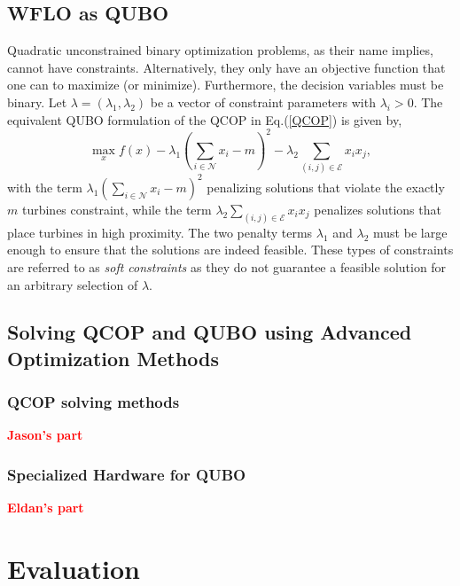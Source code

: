 \documentclass[preprint,12pt]{elsarticle}
\newcommand{\todo}[1]{{\textcolor{red}{\bf {#1}}}}
\begin{document}
\subsection{WFLO as QUBO}

Quadratic unconstrained binary optimization problems, as their name implies, cannot have constraints. Alternatively, they only 
have an objective function that 
one can to maximize (or minimize). Furthermore, the decision variables must be binary. Let $\lambda = (\lambda_1,\lambda_2)$ 
be a vector of constraint parameters with $\lambda_i >0$. The equivalent QUBO formulation of the QCOP in Eq.(\ref{QCOP}) is given by,
\begin{equation}\max_{x}^{} f(x) - \lambda_1 (\sum_{i \in \mathcal{N}}^{} x_i -m) ^2 - \lambda_2 \sum_{(i,j) \in \mathcal{E}}^{} x_i x_j , \label{QUBO}\end{equation}
with the term $ \lambda_1 (\sum_{i \in \mathcal{N}}^{} x_i -m) ^2$ 
penalizing solutions that violate the exactly $m$ turbines constraint, while the term $\lambda_2 \sum_{(i,j) \in \mathcal{E}}^{} x_i x_j$ penalizes
solutions that place turbines in high proximity. The two penalty terms $\lambda_1$ and $\lambda_2$ 
must be large enough to ensure that the solutions are indeed feasible. These types of constraints
are referred to as \emph{soft constraints} as they do not guarantee a feasible solution 
for an arbitrary selection of $\lambda$.   


\subsection{Solving QCOP and QUBO using Advanced Optimization Methods}

\subsubsection{QCOP solving methods}

\todo{Jason's part}

\subsubsection{Specialized Hardware for QUBO}

\todo{Eldan's part}


\section{Evaluation}
\label{sec:eval}
\end{document}
